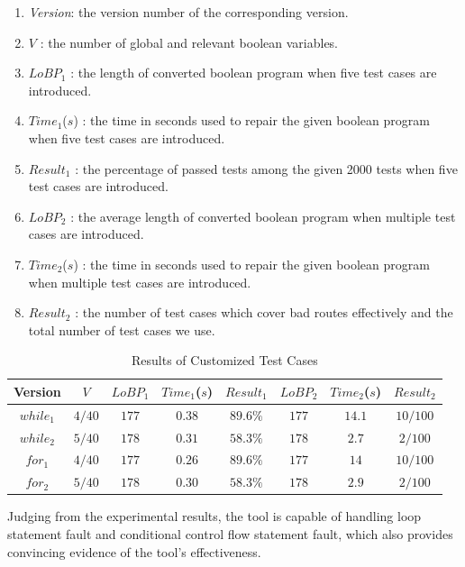 \begin{enumerate}
\item {\it Version}: the version number of the corresponding version.
\item $V$             : the number of global and relevant boolean variables.
\item $LoBP_{1}$      : the length of converted boolean program when five test cases are introduced.
\item $Time_{1}$($s$) : the time in seconds used to repair the given boolean program when five test cases are introduced.
\item $Result_{1}$    : the percentage of passed tests among the given 2000 tests when five test cases are introduced.
\item $LoBP_{2}$      : the average length of converted boolean program when multiple test cases are introduced.
\item $Time_{2}$($s$) : the time in seconds used to repair the given boolean program when multiple test cases are introduced.
\item $Result_{2}$    : the number of test cases which cover bad routes effectively and the total number of test cases we use.
\end{enumerate}

\begin{table}
\small
\center
\caption{Results of Customized Test Cases}
\label{table:RoCTC}
\begin{tabular}{|c|c|c|c|c|c|c|c|}
\hline
Version   & $V$     & $LoBP_{1}$ & $Time_{1}$($s$) & $Result_{1}$ &$LoBP_{2}$ & $Time_{2}$($s$) & $Result_{2}$ \\
\hline
$while_1$ & $4/40$  & $177$      & $0.38$          & $89.6\%$     & $177$     & $14.1$          & $10/100$     \\
\hline
$while_2$ & $5/40$  & $178$      & $0.31$          & $58.3\%$     & $178$     & $2.7$           & $2/100$      \\
\hline
$for_1$   & $4/40$  & $177$      & $0.26$          & $89.6\%$     & $177$     & $14$            & $10/100$     \\
\hline
$for_2$   & $5/40$  & $178$      & $0.30$          & $58.3\%$     & $178$     & $2.9$           & $2/100$      \\
\hline
\end{tabular}
\end{table}

Judging from the experimental results, the tool is capable of handling loop statement fault and conditional control flow statement fault, which also provides convincing evidence of the tool's effectiveness.

